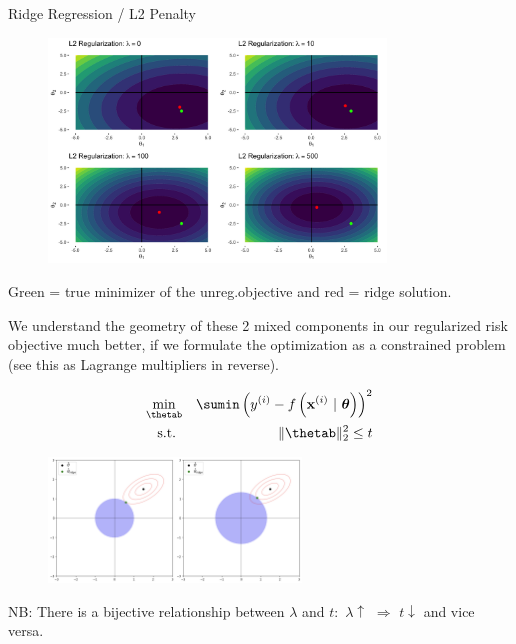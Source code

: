 \documentclass[11pt,compress,t,notes=noshow, xcolor=table]{beamer}
\begin{document}
\begin{vbframe}{Ridge Regression / L2 Penalty}
\begin{figure}
\includegraphics[width=0.8\textwidth]{figure/ridge_contours.png}
\end{figure}
\vspace{-0.2cm}
Green  = true minimizer of the unreg.objective and red = ridge solution.

\framebreak

We understand the geometry of these 2 mixed components in our regularized risk objective much better, if we formulate the optimization as a constrained problem (see this as Lagrange multipliers in reverse).

\vspace{-0.5cm}

\begin{eqnarray*}
\min_{\thetab} && \sumin \left(\yi - \fxit\right)^2 \\
  \text{s.t. } && \|\thetab\|_2^2  \leq t \\
\end{eqnarray*}

\vspace{-1.0cm}

\begin{figure}
\includegraphics[width=0.6\textwidth]{figure/ridge_constraints.png}
\end{figure}

\begin{footnotesize} 
NB: There is a bijective relationship between $\lambda$ and $t$: $\, \lambda \uparrow \,\, \Rightarrow \,\, t \downarrow$ and vice versa.
\end{footnotesize}


\end{vbframe}
\end{document}
